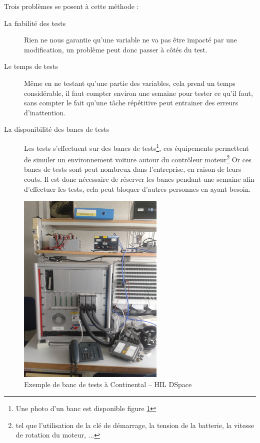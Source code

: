 	Trois problèmes se posent à cette méthode : 
	\begin{description}
		\item[La fiabilité des tests] Rien ne nous garantie qu'une variable ne va pas être impacté par une modification, un problème peut donc passer à côtés du test.
		\item[Le temps de tests] Même en ne testant qu'une partie des variables, cela prend un temps considérable, il faut compter environ une semaine pour tester ce qu'il faut, sans compter le fait qu'une tâche répétitive peut entrainer des erreurs d'inattention.
		\item[La disponibilité des bancs de tests]	Les tests s'effectuent sur des bancs de tests\footnote{Une photo d'un banc est disponible figure \ref{fig:photoHil}}, ces équipements permettent de simuler un environnement voiture autour du contrôleur moteur\footnote{tel que l'utilisation de la clé de démarrage, la tension de la batterie, la vitesse de rotation du moteur, ...} Or ces bancs de tests sont peut nombreux dans l'entreprise, en raison de leurs couts. Il est donc nécessaire de réserver les bancs pendant une semaine afin d'effectuer les tests, cela peut bloquer d'autres personnes en ayant besoin.
	\end{description}
	\begin{figure}[H]
		\centering
		\includegraphics[width=7cm]{contents/images/hil.jpg}
		\caption{Exemple de banc de tests à Continental -- HIL DSpace}
		\label{fig:photoHil}
	\end{figure}


